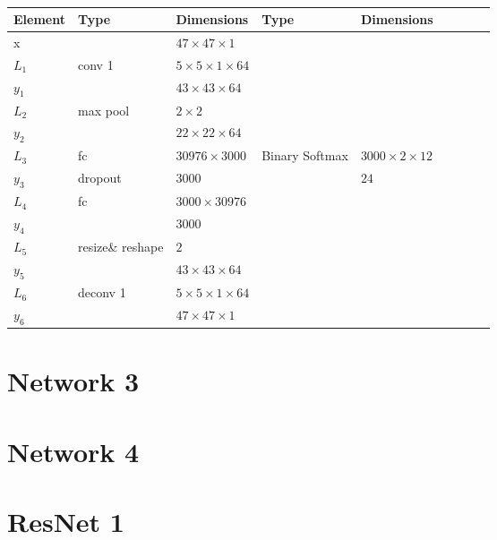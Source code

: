 \begin{table}[h!]
\centering
{\footnotesize
\begin{tabular}{|lllllllll|}
\hline
\multicolumn{1}{|l|}{Element} & Type     & \multicolumn{1}{l|}{Dimensions}                     & Type     & \multicolumn{1}{l|}{Dimensions}  \\ \hline
\multicolumn{1}{|l|}{x}       &          & \multicolumn{1}{l|}{$47\times47\times1$}            &          & \multicolumn{1}{l|}{}        \\ \hline
\multicolumn{1}{|l|}{$L_1$}   & conv 1   & \multicolumn{1}{l|}{$5\times 5\times1\times 64$}    &          & \multicolumn{1}{l|}{}\\
\multicolumn{1}{|l|}{$y_1$}   &          & \multicolumn{1}{l|}{$43\times43\times64$}           &          & \multicolumn{1}{l|}{}        \\ \hline
\multicolumn{1}{|l|}{$L_2$}   & max pool & \multicolumn{1}{l|}{$2\times 2$}                    &          & \multicolumn{1}{l|}{}        \\
\multicolumn{1}{|l|}{$y_2$}   &          & \multicolumn{1}{l|}{$22\times22\times 64$}          &          & \multicolumn{1}{l|}{}        \\ \hline
\multicolumn{1}{|l|}{$L_3$}   & fc       & \multicolumn{1}{l|}{$30976\times3000$}              & Binary Softmax & \multicolumn{1}{l|}{$3000\times2\times12$}        \\
\multicolumn{1}{|l|}{$y_3$}   & dropout  & \multicolumn{1}{l|}{$3000$}                         &          & \multicolumn{1}{l|}{$24$}        \\ \hline
\multicolumn{1}{|l|}{$L_4$}   & fc       & \multicolumn{1}{l|}{$3000\times30976$}              &          & \multicolumn{1}{l|}{}        \\
\multicolumn{1}{|l|}{$y_4$}   &          & \multicolumn{1}{l|}{$3000$}                         &          & \multicolumn{1}{l|}{}        \\ \hline
\multicolumn{1}{|l|}{$L_5$}   & resize\& reshape & \multicolumn{1}{l|}{$2$}                    &          & \multicolumn{1}{l|}{}        \\
\multicolumn{1}{|l|}{$y_5$}   &          & \multicolumn{1}{l|}{$43\times43\times 64$}          &          & \multicolumn{1}{l|}{}        \\ \hline
\multicolumn{1}{|l|}{$L_6$}   & deconv 1   & \multicolumn{1}{l|}{$5\times 5\times1\times 64$}    &          & \multicolumn{1}{l|}{}\\
\multicolumn{1}{|l|}{$y_6$}   &          & \multicolumn{1}{l|}{$47\times47\times1$}           &          & \multicolumn{1}{l|}{}        \\ \hline
\end{tabular}

\caption{} \label{compnet}

}
\end{table}

\section*{Network 3} \label{net:2}
\section*{Network 4} \label{net:2}
\section*{ResNet 1} \label{net:res1}
